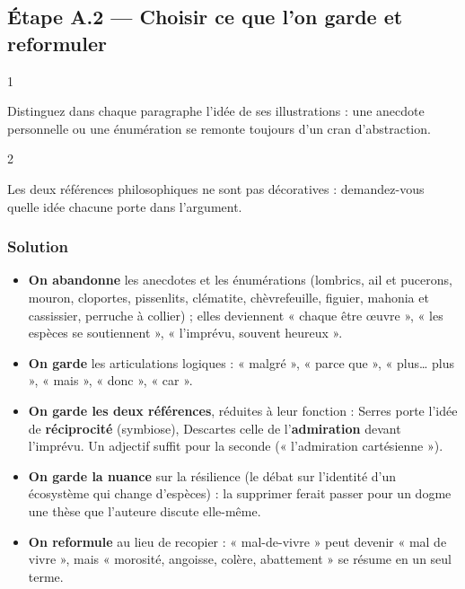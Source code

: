 \documentclass[11pt,a4paper]{article}
\providecommand{\tightlist}{\setlength{\itemsep}{0pt}\setlength{\parskip}{0pt}}
\begin{document}
\hypertarget{uxe9tape-a.2-choisir-ce-que-lon-garde-et-reformuler}{%
\subsection{Étape A.2 --- Choisir ce que l'on garde et reformuler}\label{uxe9tape-a.2-choisir-ce-que-lon-garde-et-reformuler}}

\begin{indication}{1}

Distinguez dans chaque paragraphe l'idée de ses illustrations : une anecdote personnelle ou une énumération se remonte toujours d'un cran d'abstraction.

\end{indication}

\begin{indication}{2}

Les deux références philosophiques ne sont pas décoratives : demandez-vous quelle idée chacune porte dans l'argument.

\end{indication}

\hypertarget{solution-1}{%
\subsubsection{Solution}\label{solution-1}}

\begin{itemize}
\tightlist
\item
  \textbf{On abandonne} les anecdotes et les énumérations (lombrics, ail et pucerons, mouron, cloportes, pissenlits, clématite, chèvrefeuille, figuier, mahonia et cassissier, perruche à collier) ; elles deviennent « chaque être œuvre », « les espèces se soutiennent », « l'imprévu, souvent heureux ».
\item
  \textbf{On garde} les articulations logiques : « malgré », « parce que », « plus\ldots{} plus », « mais », « donc », « car ».
\item
  \textbf{On garde les deux références}, réduites à leur fonction : Serres porte l'idée de \textbf{réciprocité} (symbiose), Descartes celle de l'\textbf{admiration} devant l'imprévu. Un adjectif suffit pour la seconde (« l'admiration cartésienne »).
\item
  \textbf{On garde la nuance} sur la résilience (le débat sur l'identité d'un écosystème qui change d'espèces) : la supprimer ferait passer pour un dogme une thèse que l'auteure discute elle-même.
\item
  \textbf{On reformule} au lieu de recopier : « mal-de-vivre » peut devenir « mal de vivre », mais « morosité, angoisse, colère, abattement » se résume en un seul terme.
\end{itemize}
\end{document}
